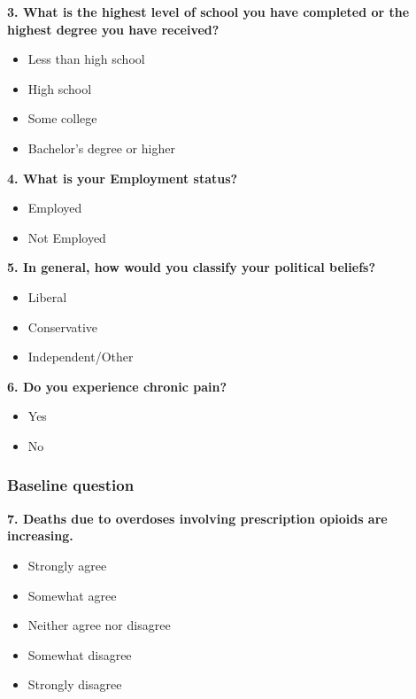 \documentclass[
]{article}
\providecommand{\tightlist}{%
  \setlength{\itemsep}{0pt}\setlength{\parskip}{0pt}}
\begin{document}
\textbf{3. What is the highest level of school you have completed or the
highest degree you have received?}

\begin{itemize}
\tightlist
\item
  Less than high school
\item
  High school
\item
  Some college
\item
  Bachelor's degree or higher
\end{itemize}

\textbf{4. What is your Employment status?}

\begin{itemize}
\tightlist
\item
  Employed
\item
  Not Employed
\end{itemize}

\textbf{5. In general, how would you classify your political beliefs?}

\begin{itemize}
\tightlist
\item
  Liberal
\item
  Conservative
\item
  Independent/Other
\end{itemize}

\textbf{6. Do you experience chronic pain?}

\begin{itemize}
\tightlist
\item
  Yes
\item
  No
\end{itemize}

\hypertarget{baseline-question}{%
\subsubsection{Baseline question}\label{baseline-question}}

\textbf{7. Deaths due to overdoses involving prescription opioids are
increasing.}

\begin{itemize}
\tightlist
\item
  Strongly agree
\item
  Somewhat agree
\item
  Neither agree nor disagree
\item
  Somewhat disagree
\item
  Strongly disagree
\end{itemize}
\end{document}
